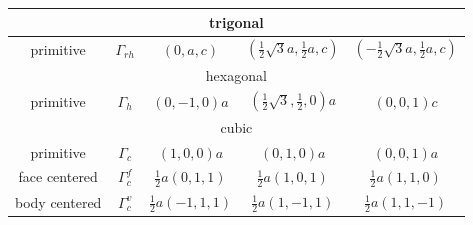 \documentclass[final,12pt]{article}
\begin{document}
{{{{{{\begin{center}
\begin{tabular}{|c|c|c|c|c|}
\hline
%
\hline
\multicolumn{5}{|c|}{trigonal}\\
\hline
primitive & $\Gamma_{rh}$ & 
$(0,a,c)$ & 
$(\frac{1}{2}\sqrt{3}a,\frac{1}{2}a,c)$ &
$(-\frac{1}{2}\sqrt{3}a,\frac{1}{2}a,c)$ \\
\hline
%
\hline
\multicolumn{5}{|c|}{hexagonal}\\
\hline
primitive & $\Gamma_h$ & 
$(0,-1,0)a$ & 
$(\frac{1}{2}\sqrt{3},\frac{1}{2},0)a$ &
$(0,0,1)c$\\
\hline
%
\hline
\multicolumn{5}{|c|}{cubic}\\
\hline
primitive & $\Gamma_c$ & 
$(1,0,0)a$ & 
$(0,1,0)a$ & 
$(0,0,1)a$ \\
face centered & $\Gamma_c^f$ & 
$\frac{1}{2}a(0,1,1)$ & 
$\frac{1}{2}a(1,0,1)$ & 
$\frac{1}{2}a(1,1,0)$ \\
body centered & $\Gamma_c^v$ & 
$\frac{1}{2}a(-1,1,1)$ & 
$\frac{1}{2}a(1,-1,1)$ & 
$\frac{1}{2}a(1,1,-1)$ \\
\hline
\end{tabular}
\end{center}

\newpage
}}}}}}
\end{document}
